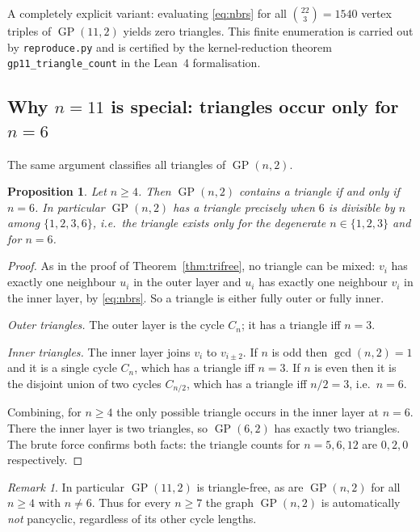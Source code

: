 \documentclass[11pt]{article}
\newtheorem{proposition}[theorem]{Proposition}
\theoremstyle{definition}
\theoremstyle{remark}
\newtheorem{remark}[theorem]{Remark}
\newcommand{\GP}{\operatorname{GP}}
\begin{document}
A completely explicit variant: evaluating \eqref{eq:nbrs} for all
$\binom{22}{3} = 1540$ vertex triples of $\GP(11,2)$ yields zero triangles. This
finite enumeration is carried out by \texttt{reproduce.py} and is certified by
the kernel-reduction theorem \texttt{gp11\_triangle\_count} in the Lean~4
formalisation.

\subsection{Why $n = 11$ is special: triangles occur only for $n=6$}

The same argument classifies all triangles of $\GP(n,2)$.

\begin{proposition}\label{prop:triangle}
Let $n \ge 4$. Then $\GP(n,2)$ contains a triangle if and only if $n = 6$. In
particular $\GP(n,2)$ has a triangle precisely when $6$ is divisible by $n$
among $\{1,2,3,6\}$, i.e.\ the triangle exists only for the degenerate
$n \in \{1,2,3\}$ and for $n = 6$.
\end{proposition}

\begin{proof}
As in the proof of Theorem~\ref{thm:trifree}, no triangle can be mixed:
$v_i$ has exactly one neighbour $u_i$ in the outer layer and $u_i$ has exactly
one neighbour $v_i$ in the inner layer, by \eqref{eq:nbrs}. So a triangle is
either fully outer or fully inner.

\emph{Outer triangles.} The outer layer is the cycle $C_n$; it has a triangle
iff $n = 3$.

\emph{Inner triangles.} The inner layer joins $v_i$ to $v_{i\pm2}$. If $n$ is
odd then $\gcd(n,2)=1$ and it is a single cycle $C_n$, which has a triangle iff
$n=3$. If $n$ is even then it is the disjoint union of two cycles $C_{n/2}$,
which has a triangle iff $n/2 = 3$, i.e.\ $n = 6$.

Combining, for $n \ge 4$ the only possible triangle occurs in the inner layer at
$n = 6$. There the inner layer is two triangles, so $\GP(6,2)$ has exactly two
triangles. The brute force confirms both facts: the triangle counts for
$n = 5,6,12$ are $0,2,0$ respectively.
\end{proof}

\begin{remark}
In particular $\GP(11,2)$ is triangle-free, as are $\GP(n,2)$ for all
$n \ge 4$ with $n \ne 6$. Thus for every $n \ge 7$ the graph $\GP(n,2)$ is
automatically \emph{not} pancyclic, regardless of its other cycle lengths.
\end{remark}
\end{document}
